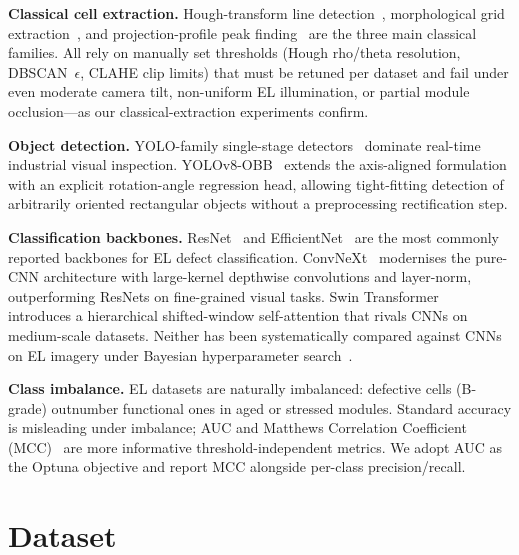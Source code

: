 \documentclass[conference]{IEEEtran}
\begin{document}
\textbf{Classical cell extraction.} Hough-transform line detection~\cite{duda1972}, morphological grid extraction~\cite{soille2003}, and projection-profile peak finding~\cite{wong1982} are the three main classical families. All rely on manually set thresholds (Hough rho/theta resolution, DBSCAN~$\epsilon$, CLAHE clip limits) that must be retuned per dataset and fail under even moderate camera tilt, non-uniform EL illumination, or partial module occlusion---as our classical-extraction experiments confirm.

\textbf{Object detection.} YOLO-family single-stage detectors~\cite{redmon2016,jocher2023} dominate real-time industrial visual inspection. YOLOv8-OBB~\cite{jocher2023} extends the axis-aligned formulation with an explicit rotation-angle regression head, allowing tight-fitting detection of arbitrarily oriented rectangular objects without a preprocessing rectification step.

\textbf{Classification backbones.} ResNet~\cite{he2016} and EfficientNet~\cite{tan2019} are the most commonly reported backbones for EL defect classification. ConvNeXt~\cite{liu2022} modernises the pure-CNN architecture with large-kernel depthwise convolutions and layer-norm, outperforming ResNets on fine-grained visual tasks. Swin Transformer~\cite{liu2021} introduces a hierarchical shifted-window self-attention that rivals CNNs on medium-scale datasets. Neither has been systematically compared against CNNs on EL imagery under Bayesian hyperparameter search~\cite{akiba2019}.

\textbf{Class imbalance.} EL datasets are naturally imbalanced: defective cells (B-grade) outnumber functional ones in aged or stressed modules. Standard accuracy is misleading under imbalance; AUC and Matthews Correlation Coefficient (MCC)~\cite{deitsch2019} are more informative threshold-independent metrics. We adopt AUC as the Optuna objective and report MCC alongside per-class precision/recall.

\section{Dataset}
\label{sec:dataset}
\end{document}
